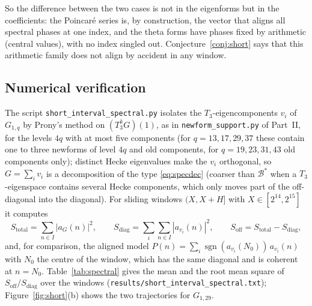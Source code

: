 \documentclass[11pt]{amsart}
\theoremstyle{remark}
\newcommand{\cB}{\mathcal{B}}
\begin{document}
So the difference between the two cases is not in the eigenforms but in the coefficients: the Poincar\'e series is, by construction, the vector that aligns all spectral phases at one index, and the theta forms have phases fixed by arithmetic (central values), with no index singled out. Conjecture~\ref{conj:short} says that this arithmetic family does not align by accident in any window.

\subsection{Numerical verification}
The script \texttt{short\_interval\_spectral.py} isolates the $T_3$-eigencomponents $v_i$ of $G_{1,q}$ by Prony's method on $(T_3^kG)(1)$, as in \texttt{newform\_support.py} of Part~II, for the levels $4q$ with at most five components (for $q=13,17,29,37$ these contain one to three newforms of level $4q$ and old components, for $q=19,23,31,43$ old components only); distinct Hecke eigenvalues make the $v_i$ orthogonal, so $G=\sum_iv_i$ is a decomposition of the type \eqref{eq:specdec} (coarser than $\cB^*$ when a $T_3$-eigenspace contains several Hecke components, which only moves part of the off-diagonal into the diagonal). For sliding windows $(X,X+H]$ with $X\in[2^{14},2^{15}]$ it computes
\[
S_{\mathrm{total}}=\sum_{n\in I}|a_G(n)|^2,\qquad S_{\mathrm{diag}}=\sum_i\sum_{n\in I}|a_{v_i}(n)|^2,\qquad S_{\mathrm{off}}=S_{\mathrm{total}}-S_{\mathrm{diag}},
\]
and, for comparison, the aligned model $P(n)=\sum_i\operatorname{sgn}(a_{v_i}(N_0))\,a_{v_i}(n)$ with $N_0$ the centre of the window, which has the same diagonal and is coherent at $n=N_0$. Table~\ref{tab:spectral} gives the mean and the root mean square of $S_{\mathrm{off}}/S_{\mathrm{diag}}$ over the windows (\texttt{results/short\_interval\_spectral.txt}); Figure~\ref{fig:short}(b) shows the two trajectories for $G_{1,29}$.
\end{document}

